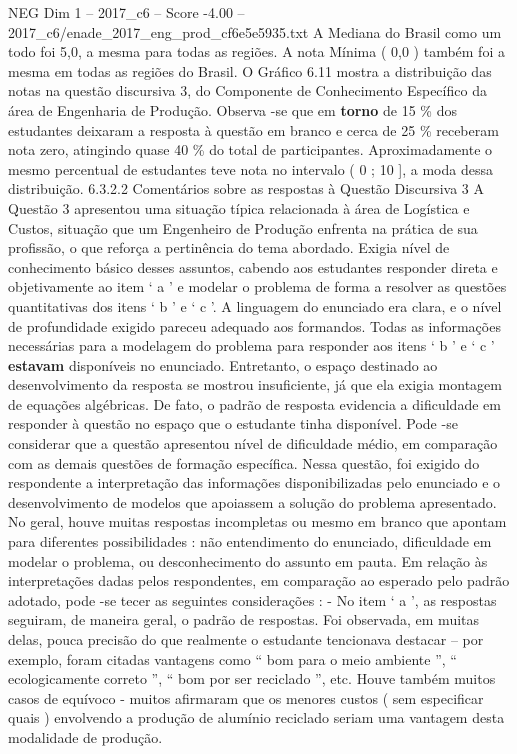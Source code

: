\begin{textsample}{NEG Dim 1 – 2017\_c6 – Score -4.00 – 2017\_c6/enade\_2017\_eng\_prod\_cf6e5e5935.txt}
A Mediana do Brasil como um todo foi 5,0, a mesma para todas as regiões.
A nota Mínima ( 0,0 ) também foi a mesma em todas as regiões do Brasil.
O Gráfico 6.11 mostra a distribuição das notas na questão discursiva 3, do Componente de Conhecimento Específico da área de Engenharia de Produção.
Observa -se que em \textbf{torno} de 15 \% dos estudantes deixaram a resposta à questão em branco e cerca de 25 \% receberam nota zero, atingindo quase 40 \% do total de participantes.
Aproximadamente o mesmo percentual de estudantes teve nota no intervalo ( 0 ; 10 ], a moda dessa distribuição. 6.3.2.2 Comentários sobre as respostas à Questão Discursiva 3 A Questão 3 apresentou uma situação típica relacionada à área de Logística e Custos, situação que um Engenheiro de Produção enfrenta na prática de sua profissão, o que reforça a pertinência do tema abordado.
Exigia nível de conhecimento básico desses assuntos, cabendo aos estudantes responder direta e objetivamente ao item ‘ a ’ e modelar o problema de forma a resolver as questões quantitativas dos itens ‘ b ’ e ‘ c ’.
A linguagem do enunciado era clara, e o nível de profundidade exigido pareceu adequado aos formandos.
Todas as informações necessárias para a modelagem do problema para responder aos itens ‘ b ’ e ‘ c ’ \textbf{estavam} disponíveis no enunciado.
Entretanto, o espaço destinado ao desenvolvimento da resposta se mostrou insuficiente, já que ela exigia montagem de equações algébricas.
De fato, o padrão de resposta evidencia a dificuldade em responder à questão no espaço que o estudante tinha disponível.
Pode -se considerar que a questão apresentou nível de dificuldade médio, em comparação com as demais questões de formação específica.
Nessa questão, foi exigido do respondente a interpretação das informações disponibilizadas pelo enunciado e o desenvolvimento de modelos que apoiassem a solução do problema apresentado.
No geral, houve muitas respostas incompletas ou mesmo em branco que apontam para diferentes possibilidades : não entendimento do enunciado, dificuldade em modelar o problema, ou desconhecimento do assunto em pauta.
Em relação às interpretações dadas pelos respondentes, em comparação ao esperado pelo padrão adotado, pode -se tecer as seguintes considerações : - No item ‘ a ’, as respostas seguiram, de maneira geral, o padrão de respostas.
Foi observada, em muitas delas, pouca precisão do que realmente o estudante tencionava destacar – por exemplo, foram citadas vantagens como “ bom para o meio ambiente ”, “ ecologicamente correto ”, “ bom por ser reciclado ”, etc.
Houve também muitos casos de equívoco - muitos afirmaram que os menores custos ( sem especificar quais ) envolvendo a produção de alumínio reciclado seriam uma vantagem desta modalidade de produção.

\end{textsample}

